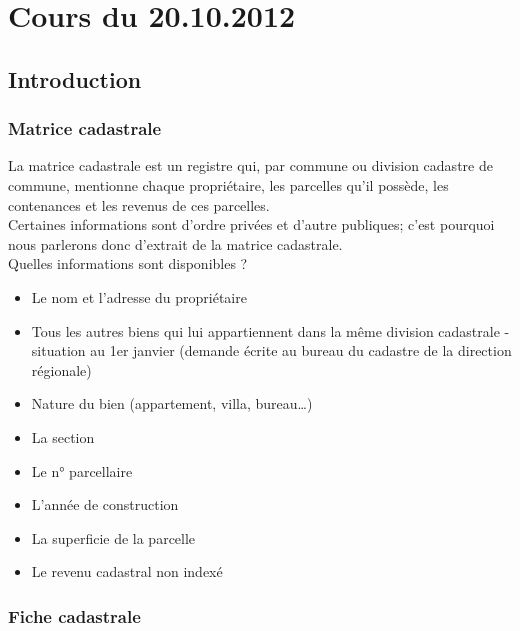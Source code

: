 \documentclass{book}
\begin{document}
\thispagestyle{empty}
\setcounter{page}{0}
\null
\newpage
{} \setcounter{page}{1} 




\tableofcontents



\chapter{Cours du 20.10.2012}
 \setcounter{page}{1} 

\section{Introduction}

\subsection{Matrice cadastrale}

La matrice cadastrale est un registre qui, par commune ou division cadastre de commune, mentionne chaque propriétaire, les parcelles qu’il possède, les contenances et les revenus de ces parcelles.\\

Certaines informations sont d'ordre privées et d'autre publiques; c'est pourquoi nous parlerons donc d'extrait de la matrice cadastrale.\\
 
Quelles informations sont disponibles ?

\begin{itemize}
\item     Le nom et l'adresse du propriétaire
\item     Tous les autres biens qui lui appartiennent dans la même division cadastrale - situation au 1er janvier (demande écrite au bureau du cadastre de la direction régionale)
\item     Nature du bien (appartement, villa, bureau…)
\item     La section
\item     Le n° parcellaire
\item     L’année de construction
\item     La superficie de la parcelle
\item     Le revenu cadastral non indexé
\end{itemize}

\subsection{Fiche cadastrale}\\
\end{document}
